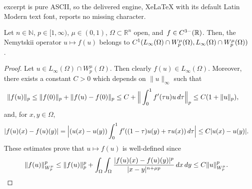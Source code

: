 \documentclass[10pt,a4paper]{amsart}
\newcommand{\N}{\mathbb{N}}
\newcommand{\R}{\mathbb{R}}
\begin{document}
excerpt is pure ASCII, so the delivered engine, XeLaTeX with its default Latin Modern text font, reports no missing character.
\begin{lemma}\label{L:NO} Let $n\in\N$, $p\in[1,\infty)$, $\mu\in (0,1)$,  $\Omega\subset \R^n$  open, and~$f\in {\rm C}^{3-}(\R)$. 
Then, the  Nemytskii operator $u\mapsto f(u)$ belongs to ${\rm C}^1(L_\infty(\Omega)\cap W^\mu_p(\Omega),L_\infty(\Omega)\cap W^\mu_p(\Omega))$.
\end{lemma}

\begin{proof}
Let $u\in L_\infty(\Omega)\cap W^\mu_p(\Omega)$. Then clearly $f(u)\in L_\infty(\Omega)$. Moreover, there exists a constant $C>0$ which depends on $\|u\|_\infty$ such that
\begin{align*}
\|f(u)\|_p&\leq \|f(0)\|_p+\|f(u)-f(0)\|_p\leq C+\Big\|\int_0^1f'(\tau u)u\, {\rm d}\tau\Big\|_p\leq C(1+\|u\|_p),
\end{align*} 
and, for $x,y\in \Omega$,
\begin{align*}
|f(u)(x)-f(u)(y)|=\Big|(u(x)-u(y))\int_0^1 f'((1-\tau)u(y)+\tau u(x))\,{\rm d}\tau \Big|\leq C|u(x)-u(y)|.
\end{align*}
These estimates prove that $u\mapsto f(u)$ is well-defined since
\begin{align*}
\|f(u)\|_{W_p^\mu}^p\leq \|f(u)\|_p^p+\int_\Omega\int_\Omega \frac{|f(u)(x)-f(u)(y)|^p}{|x-y|^{n+\mu p}}\,{\rm d} x\,{\rm d} y\leq C\|u\|_{W_p^\mu}^p.
\end{align*}



\end{proof}
\end{document}
